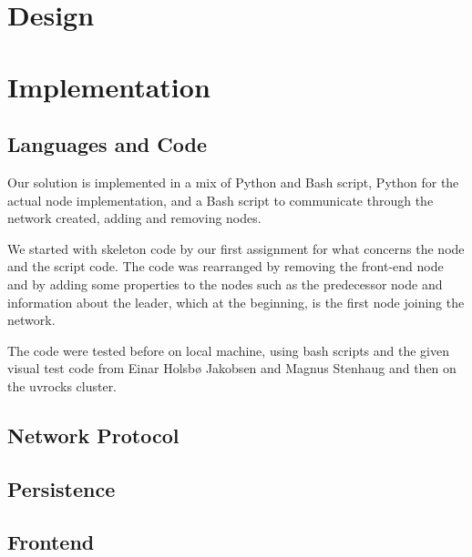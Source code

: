 \documentclass[11pt,conference]{IEEEtran}
\begin{document}
\section{Design}


\section{Implementation}


\subsection{Languages and Code}

Our solution is implemented in a mix of Python and Bash script, Python for the
actual node implementation, and a Bash script to communicate through the network created, adding and removing nodes.

We started with skeleton code by our first assignment for what concerns the node and the script code. 
The code was rearranged by removing the front-end node and by adding some properties to the nodes such as the predecessor node and information about the leader, which at the beginning, is the first node joining the network.

The code were tested before on local machine, using bash scripts and the given visual test code from Einar Holsbø Jakobsen and Magnus Stenhaug and then on the uvrocks cluster.

\subsection{Network Protocol}




\subsection{Persistence}




\subsection{Frontend}
\end{document}
